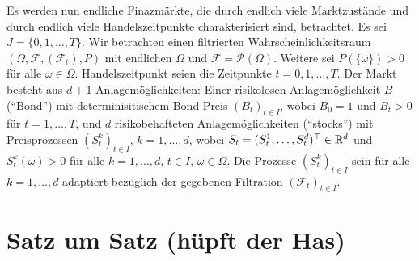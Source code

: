 \documentclass[a4paper,twoside,DIV15,BCOR12mm]{scrbook}
\newcommand{\cF}{\mathcal F}
\begin{document}
Es werden nun endliche Finazmärkte, die durch endlich viele Marktzustände und durch endlich viele Handelszeitpunkte charakterisiert sind, betrachtet. Es sei $J=\{0,1,\ldots,T\}$. Wir betrachten einen filtrierten Wahrscheinlichkeitsraum $(\Omega,\cF,(\cF_t),P)$ mit endlichen $\Omega$ und $\cF=\mathcal P(\Omega)$. Weitere sei $P(\{\omega\})>0$ für alle $\omega\in\Omega$. Handelszeitpunkt seien die Zeitpunkte $t=0,1,\ldots,T$. Der Markt besteht aus $d+1$ Anlagemöglichkeiten: Einer risikolosen Anlagemöglichkeit $B$ (“Bond”) mit determinisitischem Bond-Preis $(B_t)_{t\in I}$, wobei $B_0=1$ und $B_t>0$ für $t=1,\ldots,T$, und $d$ risikobehafteten Anlagemöglichkeiten (“stocks”) mit Preisprozessen $(S_t^k)_{t\in I}$, $k=1,\ldots,d$, wobei $S_t=(S_t^1,\ldots,S_t^d)^\top\in \mathbb{R}^d$ und $S_t^k(\omega)>0$ für alle $k=1,\ldots,d$, $t\in I$, $\omega\in \Omega$. Die Prozesse $(S_t^k)_{t\in I}$ sein für alle $k=1,\ldots,d$ adaptiert bezüglich der gegebenen Filtration $(\cF_t)_{t\in I}$.


\setcounter{secnumdepth}{-1}
\chapter{Satz um Satz (hüpft der Has)}

\renewcommand{\indexname}{Stichwortverzeichnis}
\printindex
\end{document}
